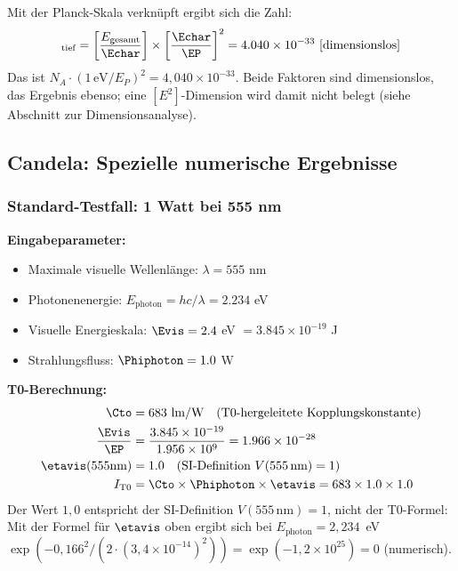 	Mit der Planck-Skala verknüpft ergibt sich die Zahl:
	\begin{equation}
		[n_{\text{T0}}]_{\text{tief}} = \left[\frac{E_{\text{gesamt}}}{\Echar}\right] \times \left[\frac{\Echar}{\EP}\right]^2 = 4.040 \times 10^{-33} \text{ [dimensionslos]}
		\label{eq:mol_e2_dimension}
	\end{equation}
	Das ist $N_A \cdot (1\,\text{eV}/E_P)^2 = 4{,}040\times10^{-33}$. Beide Faktoren sind dimensionslos, das Ergebnis ebenso; eine $[E^2]$-Dimension wird damit nicht belegt (siehe Abschnitt zur Dimensionsanalyse).
	
	\subsection{Candela: Spezielle numerische Ergebnisse}
	\label{subsec:candela_numerische_ergebnisse}
	
	\subsubsection{Standard-Testfall: 1 Watt bei 555 nm}
	\label{subsubsec:candela_555nm_test}
	
	\textbf{Eingabeparameter:}
	\begin{itemize}
		\item Maximale visuelle Wellenlänge: $\lambda = 555$ nm
		\item Photonenenergie: $E_{\text{photon}} = hc/\lambda = 2.234$ eV
		\item Visuelle Energieskala: $\Evis = 2.4$ eV $= 3.845 \times 10^{-19}$ J
		\item Strahlungsfluss: $\Phiphoton = 1.0$ W
	\end{itemize}
	
	\textbf{T0-Berechnung:}
	\begin{align}
		\Cto &= 683 \text{ lm/W} \quad \text{(T0-hergeleitete Kopplungskonstante)} \\
		\frac{\Evis}{\EP} &= \frac{3.845 \times 10^{-19}}{1.956 \times 10^{9}} = 1.966 \times 10^{-28} \\
		\etavis(555\text{nm}) &= 1.0 \quad \text{(SI-Definition } V(555\,\text{nm}) = 1\text{)} \\
		I_{\text{T0}} &= \Cto \times \Phiphoton \times \etavis = 683 \times 1.0 \times 1.0
	\end{align}
	Der Wert $1{,}0$ entspricht der SI-Definition $V(555\,\text{nm}) = 1$, nicht der T0-Formel: Mit der Formel für $\etavis$ oben ergibt sich bei $E_{\text{photon}} = 2{,}234$~eV $\exp\!\left(-0{,}166^2/(2\cdot(3{,}4\times10^{-14})^2)\right) = \exp(-1{,}2\times10^{25}) = 0$ (numerisch).
	
